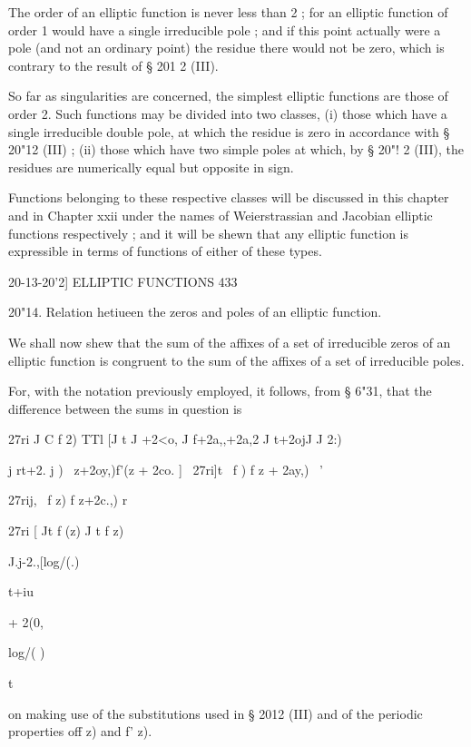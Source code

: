 The order of an elliptic function is never less than 2 ; for an elliptic 
function of order 1 would have a single irreducible pole ; and if this point 
actually were a pole (and not an ordinary point) the residue there would 
not be zero, which is contrary to the result of § 201 2 (III). 

So far as singularities are concerned, the simplest elliptic functions are 
those of order 2. Such functions may be divided into two classes, (i) those 
which have a single irreducible double pole, at which the residue is zero in 
accordance with § 20"12 (III) ; (ii) those which have two simple poles at which, 
by § 20"! 2 (III), the residues are numerically equal but opposite in sign. 

Functions belonging to these respective classes will be discussed in this 
chapter and in Chapter xxii under the names of Weierstrassian and 
Jacobian elliptic functions respectively ; and it will be shewn that any 
elliptic function is expressible in terms of functions of either of these 
types. 



20-13-20'2] ELLIPTIC FUNCTIONS 433 

20"14. Relation hetiueen the zeros and poles of an elliptic function. 

We shall now shew that the sum of the affixes of a set of irreducible 
zeros of an elliptic function is congruent to the sum of the affixes of a set of 
irreducible poles. 

For, with the notation previously employed, it follows, from § 6"31, that 
the difference between the sums in question is 

27ri J C f  2)  TTl [J t J  +2<o, J f+2a,,+2a,2 J t+2ojJ J  2:) 

  j  rt+2.  j ) \   z+2oy,)f'(z + 2co.  ] 
~27ri]t \ f  ) f z + 2ay,) \ ' 

27rij, \ f z) f z+2c.,) r 

27ri [ Jt f (z) J t f z) 



J.j-2.,[log/(.) 



t+iu 



+ 2(0, 



log/( ) 



t 



on making use of the substitutions used in § 2012 (III) and of the periodic 
properties off z) and f' z). 

